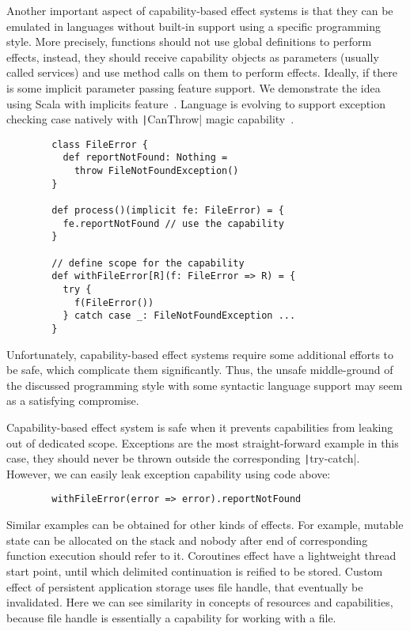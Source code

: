 \documentclass[conference]{IEEEtran}
\begin{document}
    Another important aspect of capability-based effect systems is that they can be emulated in languages without built-in support using a specific programming style.
    More precisely, functions should not use global definitions to perform effects, instead, they should receive capability objects as parameters (usually called services) and use method calls on them to perform effects.
    Ideally, if there is some implicit parameter passing feature support.
    We demonstrate the idea using Scala with implicits feature~\cite{odersky2004scala}.
    Language is evolving to support exception checking case natively with \texttt|CanThrow| magic capability~\cite{odersky2021safer}.
    \begin{verbatim}
        class FileError {
          def reportNotFound: Nothing =
            throw FileNotFoundException()
        }

        def process()(implicit fe: FileError) = {
          fe.reportNotFound // use the capability
        }

        // define scope for the capability
        def withFileError[R](f: FileError => R) = {
          try {
            f(FileError())
          } catch case _: FileNotFoundException ...
        }
    \end{verbatim}

    Unfortunately, capability-based effect systems require some additional efforts to be safe, which complicate them significantly.
    Thus, the unsafe middle-ground of the discussed programming style with some syntactic language support may seem as a satisfying compromise.

    Capability-based effect system is safe when it prevents capabilities from leaking out of dedicated scope.
    Exceptions are the most straight-forward example in this case, they should never be thrown outside the corresponding \texttt|try-catch|.
    However, we can easily leak exception capability using code above:
    \begin{verbatim}
        withFileError(error => error).reportNotFound
    \end{verbatim}

    Similar examples can be obtained for other kinds of effects.
    For example, mutable state can be allocated on the stack and nobody after end of corresponding function execution should refer to it.
    Coroutines effect have a lightweight thread start point, until which delimited continuation is reified to be stored.
    Custom effect of persistent application storage uses file handle, that eventually be invalidated.
    Here we can see similarity in concepts of resources and capabilities, because file handle is essentially a capability for working with a file.
\end{document}
